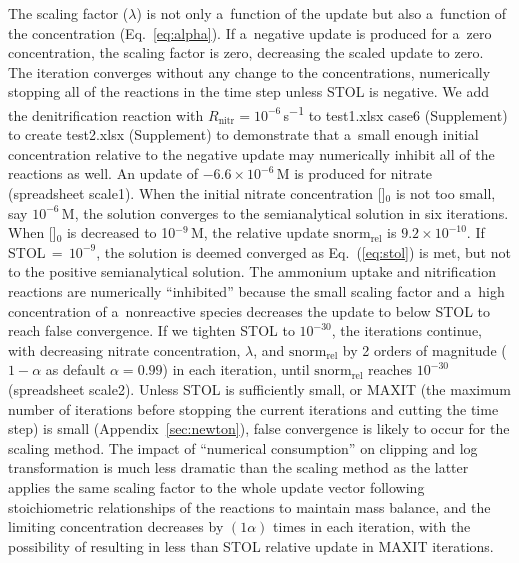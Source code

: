 \documentclass[gmd,noline]{copernicus}
\begin{document}
      The scaling factor ($\lambda$) is not only a~function of the update
      but also a~function of the concentration (Eq.~\ref{eq:alpha}). If
      a~negative update is produced for a~zero concentration, the scaling
      factor is zero, decreasing the scaled update to zero. The iteration
      converges without any change to the concentrations, numerically
      stopping all of the reactions in the time step unless STOL is
      negative. We add the denitrification reaction with $R_{\text{nitr}} =
      10^{-6}$\,\unit{s^{-1}} to  test1.xlsx case6 (Supplement) to create  test2.xlsx
      (Supplement)
      to demonstrate that a~small enough initial concentration relative to
      the negative update may numerically inhibit all of the reactions as
      well.  An update of $-6.6 \times 10^{-6}$\,\unit{M} is produced for
      nitrate (spreadsheet scale1). When the initial nitrate concentration
      []$_0$ is not too small, say $10^{-6}$\,\unit{M}, the
      solution converges to the semianalytical solution in six
      iterations. When []$_0$ is decreased to
      10$^{-9}$\,\unit{M}, the relative update $\text{snorm}_{\text{rel}}$
      is $9.2\times 10^{-10}$. If STOL\,$=$\,$10^{-9}$, the solution is
      deemed converged as Eq.~(\ref{eq:stol}) is met, but not to the
      positive semianalytical solution. The ammonium uptake and
      nitrification reactions are numerically ``inhibited'' because the
      small scaling factor and a~high concentration of a~nonreactive species
      decreases the update to below STOL to reach false convergence. If we
      tighten STOL to $10^{-30}$, the iterations continue, with decreasing
      nitrate concentration, $\lambda$, and $\text{snorm}_{\text{rel}}$ by
      2 orders of magnitude ($1-\alpha$ as default $\alpha=0.99$) in each
      iteration, until $\text{snorm}_{\text{rel}}$ reaches $10^{-30}$
      (spreadsheet scale2). Unless STOL is sufficiently small, or MAXIT (the
      maximum number of iterations before stopping the current iterations
      and cutting the time step) is small (Appendix~\ref{sec:newton}), false
      convergence is likely to occur for the scaling method. The impact of
      ``numerical consumption'' on clipping and log transformation is much
      less dramatic than the scaling method as the latter applies the same
      scaling factor to the whole update vector following stoichiometric
      relationships of the reactions to maintain mass balance, and the
      limiting concentration decreases by $(1\alpha)$ times in each
      iteration, with the possibility of resulting in less than STOL
      relative update in MAXIT iterations.
\end{document}
